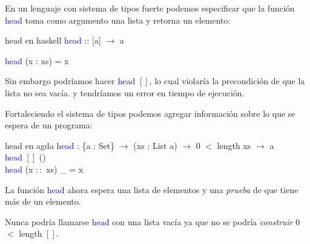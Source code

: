 \documentclass[xcolor=dvipsnames]{beamer} %
\newcommand{\cf}[1]{\textcolor{blue}{#1}}
\begin{document}
\begin{frame}
  \begin{block}{}
   En un lenguaje con sistema de tipos fuerte podemos especificar que la función \cf{head} 
   toma como argumento una lista y retorna un elemento:
  \end{block}

  \pause
  
  \begin{exampleblock}{head en haskell}
    \cf{head} :: [a] $\rightarrow$ a
    
    \cf{head} (x : xs) = x
  \end{exampleblock}  

  \pause
  
  \begin{block}{}
    Sin embargo podríamos hacer \cf{head} $[]$, lo cual violaría la precondición de que la lista no sea vacía.
     y tendríamos un error en tiempo de ejecución.
  \end{block}
  

\end{frame}

\begin{frame}
  \begin{block}{}
    Fortaleciendo el sistema de tipos podemos agregar información sobre lo que se espera de un programa:
  \end{block}

  \pause
  
  \begin{exampleblock}{head en agda}
    \cf{head} : \{a : Set\}  $\rightarrow$ (xs : List a) $\rightarrow$ 0 $<$ length xs $\rightarrow$ a \\
    \cf{head} $[]$ ()\\
    \cf{head} (x $ :: $ xs) \_ = x
  \end{exampleblock}  

  \pause
  
  \begin{block}{}
    La función \cf{head} ahora espera una lista de elementos y una \textit{prueba} de que tiene más de un elemento.
  \end{block}

  \pause
  
  \begin{block}{}
    Nunca podría llamarse \cf{head} con una lista vacía ya que no se podría \textit{construir} 0 $<$ length $[]$.
  \end{block}

\end{frame}
\end{document}
